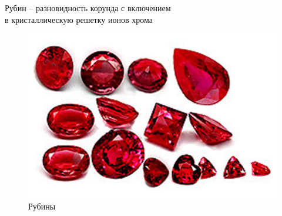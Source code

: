 \documentclass[_Banking_p3.tex]{subfiles}
\begin{document}
\begin{frame}{Рубин }{– разновидность корунда с включением\\ в кристаллическую решетку ионов хрома}
\begin{figure}	
	\centering
	\includegraphics[scale=0.5]{img/ruby.png}
	\caption{Рубины}\label{fig:ruby}
\end{figure}
\end{frame}
\end{document}
